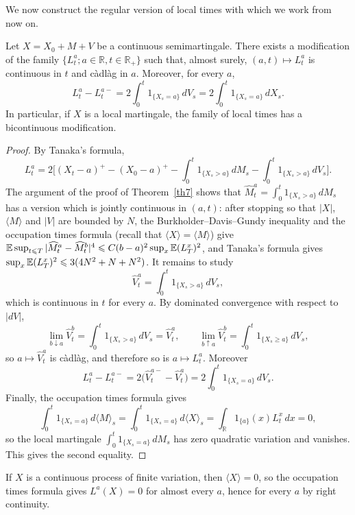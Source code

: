 We now construct the regular version of local times with which we work from
now on.

\begin{theorem}\label{th8}
	Let $X = X_0 + M + V$ be a continuous semimartingale. There exists a
	modification of the family $\{ L_t^a ; a\in \mathbb{R} , t\in \mathbb{R}_+ \}$
	such that, almost surely, $(a,t)\mapsto L_t^a$ is continuous in $t$ and
	càdlàg in $a$. Moreover, for every $a$,
	\[
		L_t^a - L_t^{a-} = 2\int_0^t 1_{\{X_s = a\}}\, dV_s=2\int_0^t 1_{\{X_s = a\}}\, dX_s .
	\]
	In particular, if $X$ is a local martingale, the family of local times
	has a bicontinuous modification.
\end{theorem}

\begin{proof}
	By Tanaka's formula,
	\[
		L_t^a =2\Big[(X_t - a)^{+} - (X_0 - a)^{+} - \int_0^t 1_{\{X_s > a\}}\, dM_s
		-\int_0^t 1_{\{X_s > a\}}\, dV_s \Big] .
	\]
	The argument of the proof of Theorem~\ref{th7} shows that
	$\widehat{M}_t^a = \int_0^t 1_{\{X_s > a\}}\, dM_s$ has a version which is
	jointly continuous in $(a,t)$: after stopping so that $|X|$,
	$\langle M\rangle$ and $|V|$ are bounded by $N$, the Burkholder--Davis--Gundy
	inequality and the occupation times formula (recall that
	$\langle X\rangle = \langle M\rangle$) give
	$\mathbb{E}\sup_{t\leqslant T}|\widehat{M}^a_t - \widehat{M}^b_t|^4 \leqslant C(b-a)^2\sup_x\mathbb{E}(L^x_T)^2$,
	and Tanaka's formula gives $\sup_x \mathbb{E}(L^x_T)^2 \leqslant 3(4N^2 + N + N^2)$.
	It remains to study
	\[
		\widehat{V}_t^a = \int_0^t 1_{\{X_s > a\}}\, dV_s ,
	\]
	which is continuous in $t$ for every $a$. By dominated convergence with
	respect to $|dV|$,
	\[
		\lim_{b\downarrow a}\widehat{V}_t^{b} = \int_0^t 1_{\{X_s > a \}}\, dV_s = \widehat{V}_t^{a},
		\qquad
		\lim_{b\uparrow a}\widehat{V}_t^{b} = \int_0^t 1_{\{X_s \geqslant a\}}\, dV_s ,
	\]
	so $a \mapsto \widehat{V}^a_t$ is càdlàg, and therefore so is
	$a\mapsto L^a_t$. Moreover
	\[
		L_t^a - L_t^{a-} =2\big( \widehat{V}_t^{a-} - \widehat{V}_t^{a}\big)
		=2\int_0^t 1_{\{X_s = a\}}\, dV_s .
	\]
	Finally, the occupation times formula gives
	\[
		\int_0^t 1_{\{X_s = a\}}\, d\langle M\rangle_s =
		\int_0^t 1_{\{X_s = a\}}\, d\langle X\rangle_s =
		\int_\mathbb{R} 1_{\{a\}}(x) L^x_t\, dx = 0,
	\]
	so the local martingale $\int_0^t 1_{\{X_s = a\}}\, dM_s$ has zero quadratic
	variation and vanishes. This gives the second equality.
\end{proof}

\begin{remark}
	If $X$ is a continuous process of finite variation, then $\langle X\rangle = 0$,
	so the occupation times formula gives $L^a(X) = 0$ for almost every $a$,
	hence for every $a$ by right continuity.
\end{remark}

